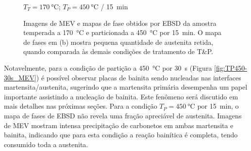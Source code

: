 \begin{figure}
  \centering
  $T_T = \SI{170}{\degreeCelsius}$; $T_P = \SI{450}{\degreeCelsius}$ / \SI{15}{min}\\
  \quad
  \quad
  \caption{Imagens de MEV e mapas de fase obtidos por EBSD da amostra temperada a \SI{170}{\degreeCelsius} e particionada a \SI{450}{\degreeCelsius} por 15~min. O mapa de fases em (b) mostra pequena quantidade de austenita retida, quando comparada às demais condições de tratamento de T\&P.}
  \label{fig:TP450-15min_MEV}
\end{figure}

Notavelmente, para a condição de partição a \SI{450}{\degreeCelsius} por 30~s (Figura \ref{fig:TP450-30s_MEV}) é possível observar placas de bainita sendo nucleadas nas interfaces martensita/austenita, sugerindo que a martensita primária desempenha um papel importante assistindo a nucleação de bainita. Este fenômeno será discutido em mais detalhes nas próximas seções. Para a condição $T_P = \SI{450}{\degreeCelsius}$ por 15~min, o mapa de fases de EBSD não revela uma fração apreciável de austenita. Imagens de MEV mostram intensa precipitação de carbonetos em ambas martensita e bainita, indicando que para esta condição a reação bainítica é completa, tendo consumido toda a austenita.

